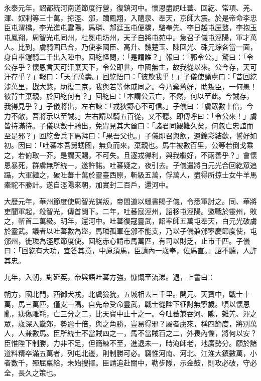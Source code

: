 \begin{pinyinscope}
 永泰元年，詔都統河南道節度行營，復鎮河中。懷恩盡說吐蕃、回紇、常項、羌、渾、奴剌等三十萬，掠涇、邠，躪鳳翔，入醴泉、奉天，京師大震。於是帝命李忠臣屯渭橋，李光進屯雲陽，馬璘、郝廷玉屯便橋，駱奉先、李日越屯厔盩，李抱玉屯鳳翔，周智光屯同州，杜冕屯坊州，天子自將屯苑中。急召子儀屯涇陽，軍才萬人。比到，虜騎圍已合，乃使李國臣、高升、魏楚玉、陳回光、硃元琮各當一面，身自率鎧騎二千出入陣中。回紇怪問，：「是謂誰？」報曰：「郭令公。」驚曰：「令公存乎？懷恩言天可汗棄天下，令公即世，中國無主，故我從以來。公今存，天可汗存乎？」報曰：「天子萬壽。」回紇悟曰：「彼欺我乎！」子儀使諭虜曰：「昔回紇涉萬里，戡大憝，助復二京，我與若等休戚同之。今乃棄舊好，助叛臣，一何愚！彼背主棄親，於回紇何有？」回紇曰：「本謂公云亡，不然，何以至此。今誠存，我得見乎？」子儀將出，左右諫：「戎狄野心不可信。」子儀曰：「虜眾數十倍，今力不敵，吾將示以至誠。」左右請以騎五百從，又不聽。即傳呼曰：「令公來！」虜皆持滿待。子儀以數十騎出，免胄見其大酋曰：「諸君同艱難久矣，何忽亡忠誼而至是邪？」回紇舍兵下馬拜曰：「果吾父也。」子儀即召與飲，遺錦彩結歡，誓好如初。因曰：「吐蕃本吾舅甥國，無負而來，棄親也。馬牛被數百里，公等若倒戈乘之，若俯取一芥，是謂天賜，不可失。且逐戎得利，與我繼好，不兩善乎？」會懷恩暴死，群虜無所統一，遂許諾。吐蕃疑之，夜引去。子儀遣將白元光合回紇眾追躡，大軍繼之，破吐蕃十萬於靈臺西原，斬級五萬，俘萬人，盡得所掠士女牛羊馬橐駝不勝計。遂自涇陽來朝，加實封二百戶，還河中。



 大歷元年，華州節度使周智光謀叛，帝間道以蠟書賜子儀，令悉軍討之。同、華將吏聞軍起，殺智光，傳首闕下。二年，吐蕃寇涇州，詔移屯涇陽。邀戰於靈州，敗之，斬首二萬級。明年，還河中。吐蕃復寇靈武，詔率師五萬屯奉天，白元光破虜於靈武。議者以吐蕃數為盜，馬璘孤軍在邠不能支，乃以子儀兼邠寧慶節度使，屯邠州，徙璘為涇原節度使。回紇赤心請市馬萬匹，有司以財乏，止市千匹。子儀曰：「回紇有大功，宜答其意，中原須馬，臣請內一歲奉，佐馬直。」詔不聽，人許其忠。



 九年，入朝，對延英，帝與語吐蕃方強，慷慨至流涕。退，上書曰：



 朔方，國北門，西御犬戎，北虞獫狁，五城相去三千里。開元、天寶中，戰士十萬，馬三萬匹，僅支一隅。自先帝受命靈武，戰士從陛下征討無寧歲。頃以懷恩亂，痍傷雕耗，亡三分之二，比天寶中止十之一。今吐蕃兼吞河、隴，雜羌、渾之眾，歲深入畿郊，勢逾十倍，與之角勝，豈易得邪？屬者虜來，稱四節度，將別萬人，人兼數馬。臣所統士不當賊四之一，馬不當賊百之二，外畏內懼，將何以安？臣惟陛下制勝，力非不足，但簡練不至，進退未一，時淹師老，地廣勢分。願於諸道料精卒滿五萬者，列屯北邊，則制勝可必。竊惟河南、河北、江淮大鎮數萬，小者數千，殫屈稟給，未始搜擇。臣請追赴關中，勒步隊，示金鼓，則攻必破，守必全，長久之策也。




\end{pinyinscope}
